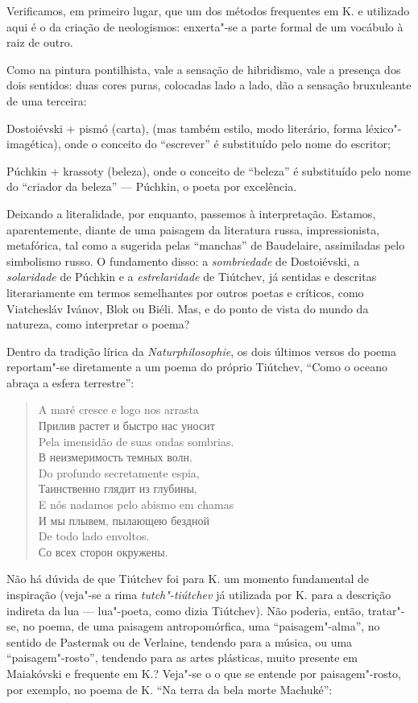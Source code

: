 {Verificamos, em primeiro lugar, que um dos métodos frequentes em K. e
utilizado aqui é o da criação de neologismos: enxerta"-se a parte formal
de um vocábulo à raiz de outro.

Como na pintura pontilhista, vale a sensação de hibridismo, vale a
presença dos dois sentidos: duas cores puras, colocadas lado a lado, dão a
sensação bruxuleante de uma terceira:

Dostoiévski + pismó (carta), (mas também estilo, modo literário, forma
léxico"-imagética), onde o conceito do ``escrever'' é substituído pelo
nome do escritor;

Púchkin + krassoty (beleza), onde o conceito de ``beleza'' é substituído
pelo nome do ``criador da beleza'' --- Púchkin, o poeta por excelência.

Deixando a literalidade, por enquanto, passemos à interpretação.
Estamos, aparentemente, diante de uma paisagem da literatura russa,
impressionista, metafórica, tal como a sugerida pelas ``manchas'' de
Baudelaire, assimiladas pelo simbolismo russo. O fundamento disso: a
\emph{sombriedade} de Dostoiévski, a \emph{solaridade} de Púchkin e a
\emph{estrelaridade} de Tiútchev, já sentidas e descritas literariamente
em termos semelhantes por outros poetas e críticos, como Viatchesláv
Ivánov, Blok ou Biéli. Mas, e do ponto de vista do mundo da natureza,
como interpretar o poema?

Dentro da tradição lírica da \emph{Naturphilosophie}, os dois últimos
versos do poema reportam"-se diretamente a um poema do próprio Tiútchev,
``Como o oceano abraça a esfera terrestre'':

\begin{verse}
A maré cresce e logo nos arrasta \\
Прилив растет и быстро нас уносит \\[8pt]
Pela imensidão de suas ondas sombrias. \\
В неизмеримость темных волн. \\[8pt]
Do profundo secretamente espia, \\
Таинственно глядит из глубины, \\[8pt]
E nós nadamos pelo abismo em chamas \\
И мы плывем, пылающею бездной \\[8pt]
De todo lado envoltos. \\
Со всех сторон окружены.
\end{verse}

Não há dúvida de que Tiútchev foi para K. um momento fundamental de
inspiração (veja"-se a rima \emph{tutch"-tiútchev} já utilizada por
K. para a descrição indireta da lua --- lua"-poeta, como dizia Tiútchev).
Não poderia, então, tratar"-se, no poema, de uma paisagem
antropomórfica, uma ``paisagem"-alma'', no sentido de Pasternak ou de
Verlaine, tendendo para a música, ou uma ``paisagem"-rosto'', tendendo para
as artes plásticas, muito presente em Maiakóvski e frequente em K.?
Veja"-se o o que se entende por paisagem"-rosto, por exemplo, no poema de
K. ``Na terra da bela morte Machuké'':

}
